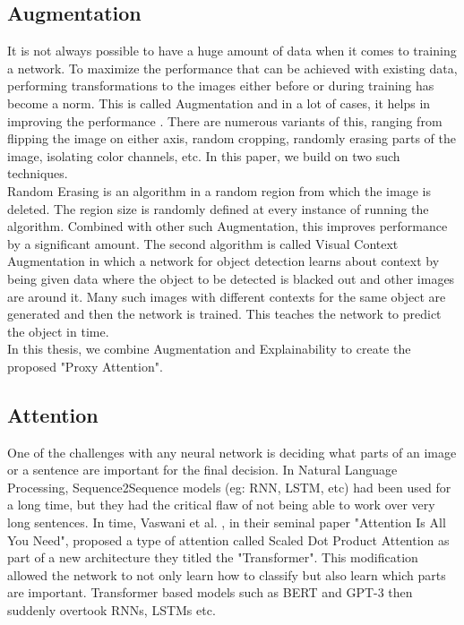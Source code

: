 \subsection*{Augmentation}
It is not always possible to have a huge amount of data when it comes to training a network. To maximize the performance that can be achieved with existing data, performing transformations to the images either before or during training has become a norm. This is called Augmentation and in a lot of cases, it helps in improving the performance \cite{perez2017effectiveness}. There are numerous variants of this, ranging from flipping the image on either axis, random cropping, randomly erasing parts of the image, isolating color channels, etc. In this paper, we build on two such techniques.\\
Random Erasing \cite{zhong2020random} is an algorithm in a random region from which the image is deleted. The region size is randomly defined at every instance of running the algorithm. Combined with other such Augmentation, this improves performance by a significant amount. The second algorithm is called Visual Context Augmentation \cite{dvornik2018modeling} in which a network for object detection learns about context by being given data where the object to be detected is blacked out and other images are around it. Many such images with different contexts for the same object are generated and then the network is trained. This teaches the network to predict the object in time.\\
In this thesis, we combine Augmentation and Explainability to create the proposed "Proxy Attention".
\subsection*{Attention}
One of the challenges with any neural network is deciding what parts of an image or a sentence are important for the final decision.
In Natural Language Processing, Sequence2Sequence models (eg: RNN, LSTM, etc) had been used for a long time, but they had the critical flaw of not being able to work over very long sentences. In time, Vaswani et al. \cite{vaswani_attention_2017}, in their seminal paper "Attention Is All You Need", proposed a type of attention called Scaled Dot Product Attention as part of a new architecture they titled the "Transformer". This modification allowed the network to not only learn how to classify but also learn which parts are important. Transformer based models such as BERT \cite{devlin_bert_2019} and GPT-3 \cite{brown_language_2020} then suddenly overtook RNNs, LSTMs etc.
